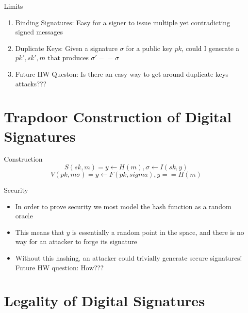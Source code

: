 \documentclass[handout]{beamer}
\begin{document}
\begin{frame}{Limits}
    \begin{enumerate}
        \item \pause Binding Signatures: Easy for a signer to issue multiple yet contradicting signed messages
        \item \pause Duplicate Keys: Given a signature \(\sigma\) for a public key \(pk\), could I generate a \(pk', sk', m\) that produces \(\sigma' == \sigma\)
        \item \pause Future HW Queston: Is there an easy way to get around duplicate keys attacks???
    \end{enumerate}
\end{frame}

\section{Trapdoor Construction of Digital Signatures}

\begin{frame}{Construction}
    \pause
    \[S(sk, m) = y \leftarrow H(m), \sigma \leftarrow I(sk, y)\]
    \pause
    \[V(pk, m \sigma) = y \leftarrow F(pk, sigma), y == H(m)\]
\end{frame}

\begin{frame}{Security}
    \begin{itemize}
        \item \pause In order to prove security we most model the hash function as a random oracle
        \item \pause This means that \(y\) is essentially a random point in the space, and there is no way for an attacker to forge its signature
        \item \pause Without this hashing, an attacker could trivially generate secure signatures! Future HW question: How???
    \end{itemize}
\end{frame}

\section{Legality of Digital Signatures}
\end{document}
